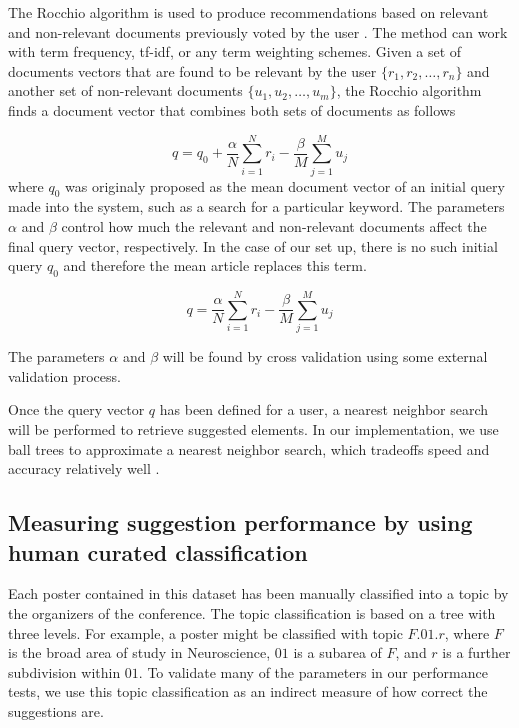 \documentclass[a4paper]{article}
\begin{document}
The Rocchio algorithm is used to produce recommendations based on relevant and non-relevant documents previously voted by the user \cite{rocchio1971relevance}. The method can work with term frequency, tf-idf, or any term weighting schemes. Given a set of documents vectors that are found to be relevant by the user $\{r_1, r_2, \ldots, r_n\}$ and another set of non-relevant documents $\{u_1, u_2, \ldots, u_m\}$, the Rocchio algorithm finds a document vector that combines both sets of documents as follows

\begin{equation} \label{eq:1}
 q = q_0 + \frac{\alpha}{N} \sum_{i=1}^N r_i - \frac{\beta}{M} \sum_{j=1}^M u_j
\end{equation}
where $q_0$ was originaly proposed as the mean document vector of an initial query made into the system, such as a search for a particular keyword. The parameters $\alpha$ and $\beta$ control how much the relevant and non-relevant documents affect the final query vector, respectively. In the case of our set up, there is no such initial query $q_0$ and therefore the mean article replaces this term.

\begin{equation} \label{eq:2}
 q = \frac{\alpha}{N} \sum_{i=1}^N r_i - \frac{\beta}{M} \sum_{j=1}^M u_j
\end{equation}

The parameters $\alpha$ and $\beta$ will be found by cross validation using some external validation process.

Once the query vector $q$ has been defined for a user, a nearest neighbor search will be performed to retrieve suggested elements. In our implementation, we use ball trees to approximate a nearest neighbor search, which tradeoffs speed and accuracy relatively well \cite{shakhnarovish2005indyk}.

\subsection{Measuring suggestion performance by using human curated classification}

Each poster contained in this dataset has been manually classified into a topic by the organizers of the conference. The topic classification is based on a tree with three levels. For example, a poster might be classified with topic $F.01.r$, where $F$ is the broad area of study in Neuroscience, $01$ is a subarea of $F$, and $r$ is a further subdivision within $01$.  To validate many of the parameters in our performance tests, we use this topic classification as an indirect measure of how correct the suggestions are.
\end{document}
